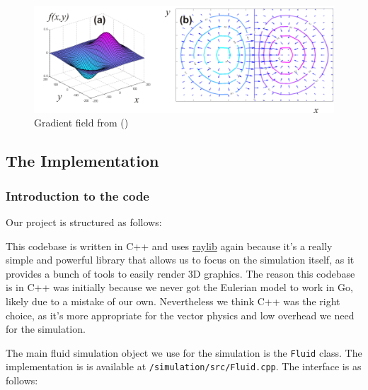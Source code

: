 \documentclass[a4paper,12pt,titlepage]{article}
\begin{document}
\begin{figure}[H]
	\centering
	\includegraphics[width=15cm]{resources/gradient_field.png}
	\caption{Gradient field from (\cite{christophefinot})}
	\label{fig:gradient_field}
\end{figure}

\pagebreak
\subsection{The Implementation} \label{implementation}
\subsubsection{Introduction to the code}
Our project is structured as follows:

This codebase is written in C++ and uses \href{https://www.raylib.com/}{raylib} again
because it's a really simple and powerful library that allows us to focus on the
simulation itself, as it provides a bunch of tools to easily render 3D graphics.
The reason this codebase is in C++ was initially because we never got the Eulerian
model to work in Go, likely due to a mistake of our own. Nevertheless we think C++
was the right choice, as it's more appropriate for the vector physics and low overhead
we need for the simulation.

The main fluid simulation object we use for the simulation is the \lstinline{Fluid} class.
The implementation is is available at \lstinline{/simulation/src/Fluid.cpp}.
The interface is as follows:
\end{document}
